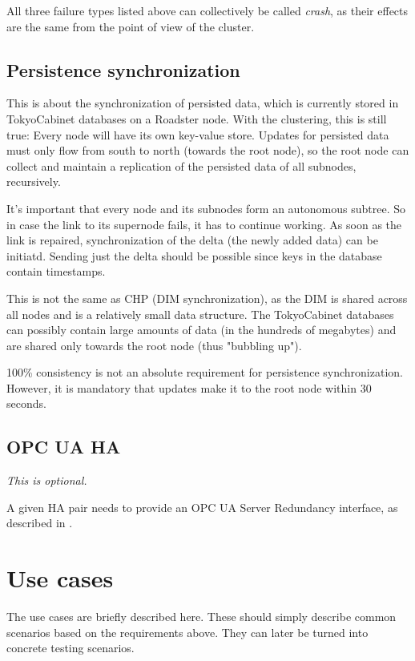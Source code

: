 All three failure types listed above can collectively be called \emph{crash},
as their effects are the same from the point of view of the cluster.

\subsection{Persistence synchronization}
This is about the synchronization of persisted data, which is currently stored
in TokyoCabinet databases on a Roadster node. With the clustering, this is
still true: Every node will have its own key-value store. Updates for persisted
data must only flow from south to north (towards the root node), so the root
node can collect and maintain a replication of the persisted data of all
subnodes, recursively.

It's important that every node and its subnodes form an autonomous subtree. So
in case the link to its supernode fails, it has to continue working. As soon as
the link is repaired, synchronization of the delta (the newly added data) can
be initiatd. Sending just the delta should be possible since keys in the
database contain timestamps.

This is not the same as \gls{CHP} (\gls{DIM} synchronization), as the DIM is shared across
all nodes and is a relatively small data structure. The TokyoCabinet databases
can possibly contain large amounts of data (in the hundreds of megabytes) and
are shared only towards the root node (thus "bubbling up").

100\% consistency is not an absolute requirement for persistence synchronization.
However, it is mandatory that updates make it to the root node within 30 seconds.

\subsection{OPC UA HA}
\emph{This is optional.}

A given \gls{HA} pair needs to provide an OPC UA Server Redundancy interface,
as described in \cite[6.4.2.4 Non-transparent Redundancy,
p.~96]{opc-ua:behavior:server-redundancy}.

\section{Use cases}
The use cases are briefly described here. These should simply describe common
scenarios based on the requirements above. They can later be turned into
concrete testing scenarios.

